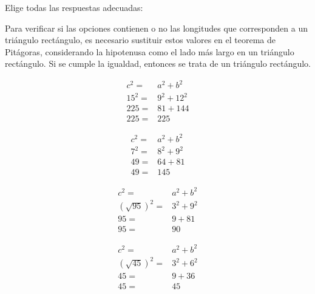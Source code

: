 Elige todas las respuestas adecuadas:

\begin{solutionbox}{6cm}
    Para verificar si las opciones contienen o no las longitudes que corresponden a un triángulo rectángulo, es necesario sustituir estos valores en el teorema de Pitágoras, considerando la hipotenusa como el lado más largo en un triángulo rectángulo. Si se cumple la igualdad, entonces se trata de un triángulo rectángulo.

    \begin{multicols}{4}
        \begin{align*}
            c^2=  & a^2+b^2  \\
            15^2= & 9^2+12^2 \\
            225=  & 81+144   \\
            225=  & 225
        \end{align*}

        \begin{align*}
            c^2= & a^2+b^2 \\
            7^2= & 8^2+9^2 \\
            49=  & 64+81   \\
            49=  & 145
        \end{align*}

        \begin{align*}
            c^2=           & a^2+b^2   \\
            (\sqrt{95})^2= & 3^2 + 9^2 \\
            95=            & 9+81      \\
            95=            & 90
        \end{align*}

        \begin{align*}
            c^2=           & a^2+b^2   \\
            (\sqrt{45})^2= & 3^2 + 6^2 \\
            45=            & 9+36      \\
            45=            & 45
        \end{align*}
    \end{multicols}

\end{solutionbox}